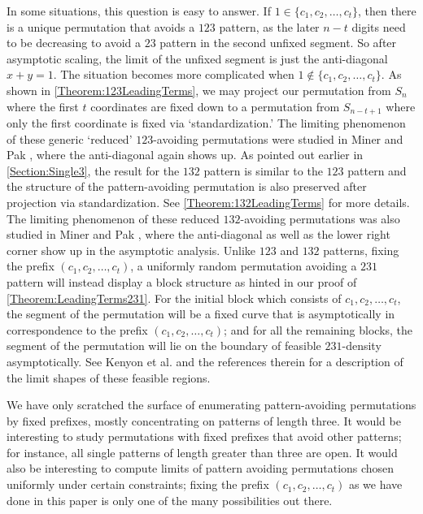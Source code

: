 \documentclass[11pt]{article}
\theoremstyle{definition}
\numberwithin{equation}{section}
\begin{document}
In some situations, this question is easy to answer. 
If $1\in\{c_1,c_2,\ldots,c_t\}$, then there is a
unique permutation that avoids a $123$ pattern, as the later $n-t$ digits need to be decreasing to avoid a $23$ pattern in the second unfixed segment. So after asymptotic scaling, the limit of the unfixed segment is just the anti-diagonal $x+y=1$. The situation becomes more complicated when $1\notin\{c_1,c_2,\ldots,c_t\}$. As shown in \cref{Theorem:123LeadingTerms}, we may project our permutation from $S_n$ where the first $t$ coordinates are fixed down to a permutation from $S_{n-t+1}$ where only the first coordinate is 
fixed via `standardization.' The limiting phenomenon of these generic `reduced' $123$-avoiding 
permutations were studied in Miner and Pak \cite{MinerPak2014}, where the anti-diagonal again 
shows up. As pointed out earlier in \cref{Section:Single3}, the result for the $132$ 
pattern is similar to the $123$ pattern and the structure of the pattern-avoiding permutation is also preserved 
after projection via standardization. See \cref{Theorem:132LeadingTerms} for more details. The limiting phenomenon 
of these reduced $132$-avoiding permutations was also studied in Miner and Pak \cite{MinerPak2014}, where the anti-diagonal as well as the lower right corner show up in the asymptotic analysis. Unlike $123$ and $132$ patterns, 
fixing the prefix $(c_1,c_2,\ldots,c_t)$, a uniformly random permutation avoiding a $231$ pattern will instead display a block structure as hinted in our proof of \cref{Theorem:LeadingTerms231}. For the initial block which consists of $c_1,c_2,\ldots,c_t$, the segment of the permutation will be a fixed curve that is asymptotically in correspondence to the prefix $(c_1,c_2,\ldots,c_t)$; and for all the remaining blocks, the segment of the permutation will lie on the boundary of feasible $231$-density asymptotically. See Kenyon et al. \cite{Kenyon} and the references therein for a description of the limit shapes of these feasible regions.

We have only scratched the surface of enumerating pattern-avoiding permutations by fixed prefixes, mostly concentrating on patterns of length three. It would be interesting to study permutations with 
fixed prefixes that avoid other patterns; for instance, all single patterns of length greater than three are open. It would also be interesting to compute limits of pattern avoiding permutations chosen uniformly under certain constraints; fixing the prefix $(c_1,c_2,\ldots,c_t)$ as we have done in this paper is only one of the many possibilities out there.
\end{document}
